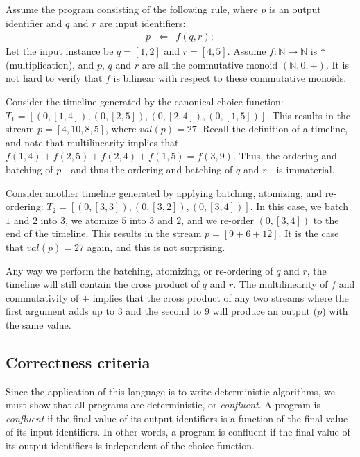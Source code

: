 \begin{example}
Assume the program consisting of the following rule, where $p$ is an output identifier and $q$ and $r$ are input identifiers:
\begin{eqnarray*}
  p &\Leftarrow& f(q, r);
\end{eqnarray*}
Let the input instance be $q = [1,2]$ and $r = [4,5]$.  Assume $f : \mathbb{N} \rightarrow \mathbb{N}$ is $*$ (multiplication), and $p$, $q$ and $r$ are all the commutative monoid $(\mathbb{N}, 0, +)$.  It is not hard to verify that $f$ is bilinear with respect to these commutative monoids.

Consider the timeline generated by the canonical choice function: $T_1 = [(0,[1,4]), (0,[2,5]), (0,[2,4]), (0,[1,5])]$.  This results in the stream $p = [4, 10, 8, 5]$, where $val(p) = 27$.  Recall the definition of a timeline, and note that multilinearity implies that $f(1,4) + f(2,5) + f(2,4) + f(1,5) = f(3,9)$.  Thus, the ordering and batching of $p$---and thus the ordering and batching of $q$ and $r$---is immaterial.

Consider another timeline generated by applying  batching, atomizing, and re-ordering: $T_2 = [(0,[3,3]), (0,[3,2]), (0,[3,4])]$.  In this case, we batch $1$ and $2$ into $3$, we atomize $5$ into $3$ and $2$, and we re-order $(0,[3,4])$ to the end of the timeline.  This results in the stream $p = [9 + 6 + 12]$.  It is the case that $val(p) = 27$ again, and this is not surprising.

Any way we perform the batching, atomizing, or re-ordering of $q$ and $r$, the timeline will still contain the cross product of $q$ and $r$.  The multilinearity of $f$ and commutativity of $+$ implies that the cross product of any two streams where the first argument adds up to $3$ and the second to $9$ will produce an output ($p$) with the same value.
\end{example}


\subsection{Correctness criteria}

Since the application of this language is to write deterministic algorithms, we must show that all programs are deterministic, or {\em confluent}.  A program is {\em confluent} if the final value of its output identifiers is a function of the final value of its input identifiers.  In other words, a program is confluent if the final value of its output identifiers is independent of the choice function.

